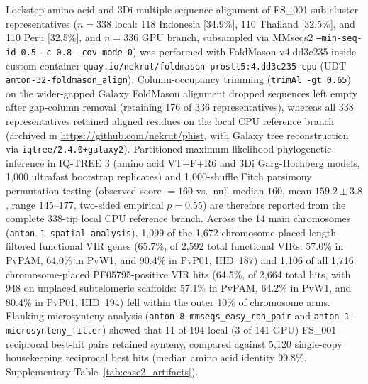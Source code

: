 \documentclass[11pt,letterpaper]{article}
\newcommand{\tool}[1]{\textsf{#1}}
\begin{document}
Lockstep amino acid and 3Di multiple sequence alignment of FS\_001 sub-cluster representatives ($n = 338$ local: 118 Indonesia [34.9\%], 110 Thailand [32.5\%], and 110 Peru [32.5\%], and $n = 336$ GPU branch, subsampled via \tool{MMseqs2} \texttt{--min-seq-id 0.5 -c 0.8 --cov-mode 0}) was performed with \tool{FoldMason} v4.dd3c235 inside custom container \nolinkurl{quay.io/nekrut/foldmason-prostt5:4.dd3c235-cpu} (UDT \nolinkurl{anton-32-foldmason_align}). Column-occupancy trimming (\texttt{trimAl -gt 0.65}) on the wider-gapped Galaxy \tool{FoldMason} alignment dropped sequences left empty after gap-column removal (retaining 176 of 336 representatives), whereas all 338 representatives retained aligned residues on the local CPU reference branch (archived in \url{https://github.com/nekrut/phist}, with Galaxy tree reconstruction via \nolinkurl{iqtree/2.4.0+galaxy2}). Partitioned maximum-likelihood phylogenetic inference in \tool{IQ-TREE 3} (amino acid VT+F+R6 and 3Di Garg-Hochberg models, 1,000 ultrafast bootstrap replicates) and 1,000-shuffle Fitch parsimony permutation testing (observed score $= 160$ vs.\ null median $160$, mean $159.2 \pm 3.8$, range $145\text{--}177$, two-sided empirical $p = 0.55$) are therefore reported from the complete 338-tip local CPU reference branch. Across the 14 main chromosomes (\nolinkurl{anton-1-spatial_analysis}), 1,099 of the 1,672 chromosome-placed length-filtered functional VIR genes (65.7\%, of 2,592 total functional VIRs: 57.0\% in PvPAM, 64.0\% in PvW1, and 90.4\% in PvP01, HID~187) and 1,106 of all 1,716 chromosome-placed PF05795-positive VIR hits (64.5\%, of 2,664 total hits, with 948 on unplaced subtelomeric scaffolds: 57.1\% in PvPAM, 64.2\% in PvW1, and 80.4\% in PvP01, HID~194) fell within the outer 10\% of chromosome arms. Flanking microsynteny analysis (\nolinkurl{anton-8-mmseqs_easy_rbh_pair} and \nolinkurl{anton-1-microsynteny_filter}) showed that 11 of 194 local (3 of 141 GPU) FS\_001 reciprocal best-hit pairs retained synteny, compared against 5,120 single-copy housekeeping reciprocal best hits (median amino acid identity 99.8\%, Supplementary Table~\ref{tab:case2_artifacts}).
\end{document}
